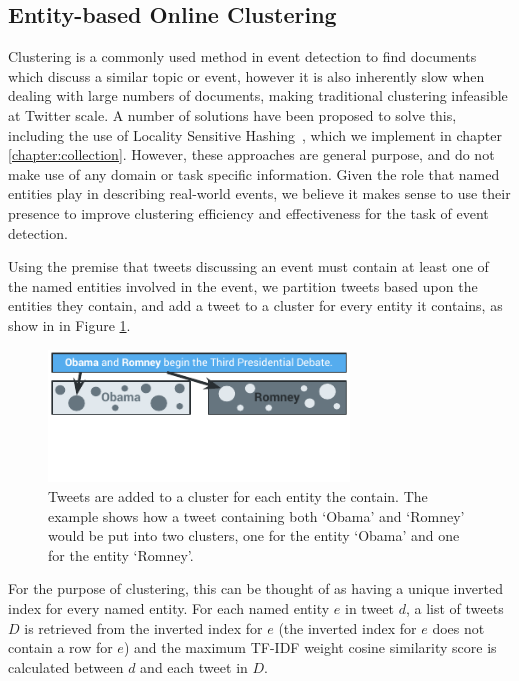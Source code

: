\subsection{Entity-based Online Clustering}
\label{detection:sec:clustering}
Clustering is a commonly used method in event detection to find documents which discuss a similar topic or event, however it is also inherently slow when dealing with large numbers of documents, making traditional clustering  infeasible at Twitter scale.
A number of solutions have been proposed to solve this, including the use of Locality Sensitive Hashing~\citep{Petrovic10}, which we implement in chapter \ref{chapter:collection}.
However, these approaches are general purpose, and do not make use of any domain or task specific information.
Given the role that named entities play in describing real-world events, we believe it makes sense to use their presence to improve clustering efficiency and effectiveness for the task of event detection.

Using the premise that tweets discussing an event must contain at least one of the named entities involved in the event, we partition tweets based upon the entities they contain, and add a tweet to a cluster for every entity it contains, as show in in Figure \ref{detection:graphic:clustering}.

\begin{figure}[h!]
	\centering
	\includegraphics[width=8cm,trim=0cm 1.5cm 0cm 0cm]{Chapters/EntityDetection/images/clustering.pdf}
	\caption[Entity-based clustering]{Tweets are added to a cluster for each entity the contain. The example shows how a tweet containing both `Obama' and `Romney' would be put into two clusters, one for the entity `Obama' and one for the entity `Romney'.}
	\label{detection:graphic:clustering}
\end{figure}

For the purpose of clustering, this can be thought of as having a unique inverted index for every named entity. For each named entity $e$ in tweet $d$, a list of tweets $D$ is retrieved from the inverted index for $e$ (the inverted index for $e$ does not contain a row for $e$) and the maximum TF-IDF weight cosine similarity score is calculated between $d$ and each tweet in $D$.

